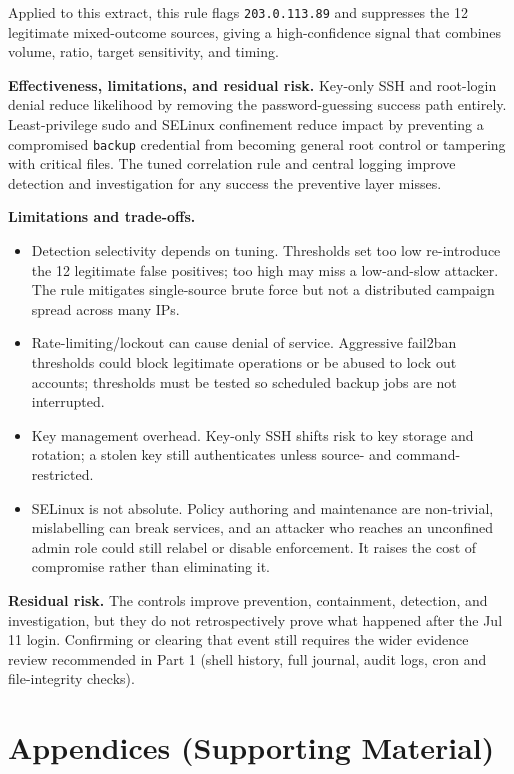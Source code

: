 \documentclass[10pt,a4paper]{article}
\newcommand{\tightsection}[1]{\vspace{6pt}\section*{#1}\vspace{-1pt}}
\begin{document}
Applied to this extract, this rule flags \texttt{203.0.113.89} and suppresses the 12 legitimate mixed-outcome sources, giving a high-confidence signal that combines volume, ratio, target sensitivity, and timing.

\textbf{Effectiveness, limitations, and residual risk.} Key-only SSH and root-login denial reduce likelihood by removing the password-guessing success path entirely. Least-privilege sudo and SELinux confinement reduce impact by preventing a compromised \texttt{backup} credential from becoming general root control or tampering with critical files. The tuned correlation rule and central logging improve detection and investigation for any success the preventive layer misses.

\textbf{Limitations and trade-offs.}
\begin{itemize}
    \item Detection selectivity depends on tuning. Thresholds set too low re-introduce the 12 legitimate false positives; too high may miss a low-and-slow attacker. The rule mitigates single-source brute force but not a distributed campaign spread across many IPs.
    \item Rate-limiting/lockout can cause denial of service. Aggressive fail2ban thresholds could block legitimate operations or be abused to lock out accounts; thresholds must be tested so scheduled backup jobs are not interrupted.
    \item Key management overhead. Key-only SSH shifts risk to key storage and rotation; a stolen key still authenticates unless source- and command-restricted.
    \item SELinux is not absolute. Policy authoring and maintenance are non-trivial, mislabelling can break services, and an attacker who reaches an unconfined admin role could still relabel or disable enforcement. It raises the cost of compromise rather than eliminating it.
\end{itemize}

\textbf{Residual risk.} The controls improve prevention, containment, detection, and investigation, but they do not retrospectively prove what happened after the Jul 11 login. Confirming or clearing that event still requires the wider evidence review recommended in Part 1 (shell history, full journal, audit logs, cron and file-integrity checks).

\clearpage
\appendix
\renewcommand{\thetable}{\Alph{section}.\arabic{table}}
\renewcommand{\thefigure}{\Alph{section}.\arabic{figure}}
\setcounter{table}{0}
\setcounter{figure}{0}
\tightsection{Appendices (Supporting Material)}
\end{document}
